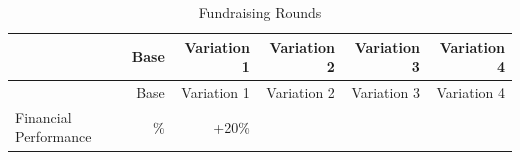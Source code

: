 \documentclass[11pt,openany]{book}
\begin{document}
\begin{longtable}[]{@{}lrrrrr@{}}
\caption{Fundraising Rounds}\tabularnewline
\toprule
\begin{minipage}[b]{0.23\columnwidth}\raggedright
\strut
\end{minipage} & \begin{minipage}[b]{0.08\columnwidth}\raggedleft
Base\strut
\end{minipage} & \begin{minipage}[b]{0.13\columnwidth}\raggedleft
Variation 1\strut
\end{minipage} & \begin{minipage}[b]{0.13\columnwidth}\raggedleft
Variation 2\strut
\end{minipage} & \begin{minipage}[b]{0.13\columnwidth}\raggedleft
Variation 3\strut
\end{minipage} & \begin{minipage}[b]{0.13\columnwidth}\raggedleft
Variation 4\strut
\end{minipage}\tabularnewline
\midrule
\endfirsthead
\toprule
\begin{minipage}[b]{0.23\columnwidth}\raggedright
\strut
\end{minipage} & \begin{minipage}[b]{0.08\columnwidth}\raggedleft
Base\strut
\end{minipage} & \begin{minipage}[b]{0.13\columnwidth}\raggedleft
Variation 1\strut
\end{minipage} & \begin{minipage}[b]{0.13\columnwidth}\raggedleft
Variation 2\strut
\end{minipage} & \begin{minipage}[b]{0.13\columnwidth}\raggedleft
Variation 3\strut
\end{minipage} & \begin{minipage}[b]{0.13\columnwidth}\raggedleft
Variation 4\strut
\end{minipage}\tabularnewline
\midrule
\endhead
\begin{minipage}[t]{0.23\columnwidth}\raggedright
Financial Performance\strut
\end{minipage} & \begin{minipage}[t]{0.08\columnwidth}\raggedleft
0\%\strut
\end{minipage} & \begin{minipage}[t]{0.13\columnwidth}\raggedleft
+20\%\strut
\end{minipage} & \begin{minipage}[t]{0.13\columnwidth}\raggedleft

\end{minipage}
\end{longtable}
\end{document}
